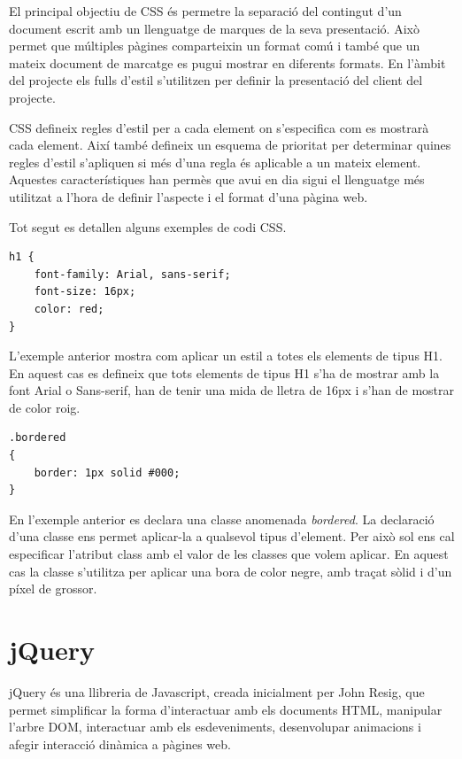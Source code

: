 El principal objectiu de CSS és permetre la separació del contingut d'un document escrit amb un llenguatge de marques de la seva presentació. Això permet que múltiples pàgines comparteixin un format comú i també que un mateix document de marcatge es pugui mostrar en diferents formats. En l'àmbit del projecte els fulls d'estil s'utilitzen per definir la presentació del client del projecte.

CSS defineix regles d'estil per a cada element on s'especifica com es mostrarà cada element. Així també defineix un esquema de prioritat per determinar quines regles d'estil s'apliquen si més d'una regla és aplicable a un mateix element. Aquestes característiques han permès que avui en dia sigui el llenguatge més utilitzat a l'hora de definir l'aspecte i el format d'una pàgina web. 

Tot segut es detallen alguns exemples de codi CSS. 

\begin{lstlisting}
h1 {
    font-family: Arial, sans-serif; 
    font-size: 16px;
    color: red;
}
\end{lstlisting}

L'exemple anterior mostra com aplicar un estil a totes els elements de tipus H1. En aquest cas es defineix que tots elements de tipus H1 s'ha de mostrar amb la font Arial o Sans-serif, han de tenir una mida de lletra de 16px i s'han de mostrar de color roig.  

\begin{lstlisting}
.bordered
{
    border: 1px solid #000;
}
\end{lstlisting}

En l'exemple anterior es declara una classe anomenada \emph{bordered}. La declaració d'una classe ens permet aplicar-la a qualsevol tipus d'element. Per això sol ens cal especificar l'atribut class amb el valor de les classes que volem aplicar. En aquest cas la classe s'utilitza per aplicar una bora de color negre, amb traçat sòlid i d'un píxel de grossor. 

\section{jQuery}

jQuery és una llibreria de Javascript, creada inicialment per John Resig, que permet simplificar la forma d'interactuar amb els documents HTML, manipular l'arbre DOM, interactuar amb els esdeveniments, desenvolupar animacions i afegir interacció dinàmica a pàgines web. 

